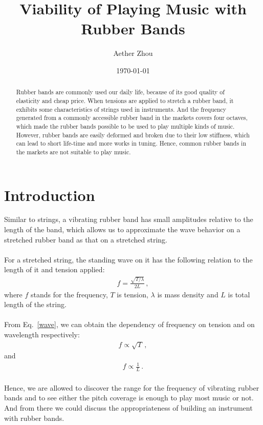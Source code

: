\documentclass[twocolumn,preprintnumbers,amsmath,amssymb,longbibliography]{revtex4-1}
\begin{document}
\title{Viability of Playing Music with Rubber Bands}%

\author{Aether Zhou}
%

\date{\today}%

\begin{abstract}
    Rubber bands are commonly used our daily life, because of its good quality of elasticity and cheap price. When tensions are applied to stretch a rubber band, it exhibits some characteristics of strings used in instruments. And the frequency generated from a commonly accessible rubber band in the markets covers four octaves, which made the rubber bands possible to be used to play multiple kinds of music. However, rubber bands are easily deformed and broken due to their low stiffness, which can lead to short life-time and more works in tuning. Hence, common rubber bands in the markets are not suitable to play music. 
\end{abstract}

\maketitle

\section{Introduction}
    Similar to strings, a vibrating rubber band has small amplitudes relative to the length of the band, which allows us to approximate the wave behavior on a stretched rubber band as that on a stretched string.\\\\
    For a stretched string, the standing wave on it has the following relation to the length of it and tension applied\cite{freq}:
    \begin{eqnarray}
        f=\frac{\sqrt{T/\lambda}}{2L} \label{wave}\, ,
    \end{eqnarray}
    where $f$ stands for the frequency, $T$ is tension, $\lambda$ is mass density and $L$ is total length of the string.
    \\
    \\
    From Eq.~\eqref{wave}, we can obtain the dependency of frequency on tension and on wavelength respectively:
    \begin{eqnarray}
        f\propto \sqrt{T}\label{ten}\,,
    \end{eqnarray}
    and
    \begin{eqnarray}
        f\propto \frac{1}{L}\label{len}\, .
    \end{eqnarray}
    \\
    Hence, we are allowed to discover the range for the frequency of vibrating rubber bands and to see either the pitch coverage is enough to play most music or not. And from there we could discuss the appropriateness of building an instrument with rubber bands. 
    \\
\end{document}
